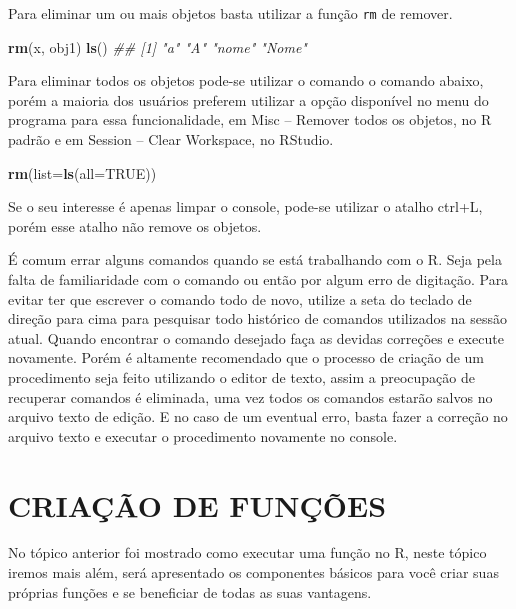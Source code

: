 \documentclass[
  11pt,
  a5paper,
  openany]{book}
\newenvironment{Shaded}{\begin{snugshade}}{\end{snugshade}}
\newcommand{\CommentTok}[1]{\textcolor[rgb]{0.56,0.35,0.01}{\textit{#1}}}
\newcommand{\DataTypeTok}[1]{\textcolor[rgb]{0.13,0.29,0.53}{#1}}
\newcommand{\KeywordTok}[1]{\textcolor[rgb]{0.13,0.29,0.53}{\textbf{#1}}}
\newcommand{\NormalTok}[1]{#1}
\newcommand{\OtherTok}[1]{\textcolor[rgb]{0.56,0.35,0.01}{#1}}
\begin{document}
Para eliminar um ou mais objetos basta utilizar a função \texttt{rm} de remover.

\begin{Shaded}
\begin{Highlighting}[]
\KeywordTok{rm}\NormalTok{(x, obj1)}
\KeywordTok{ls}\NormalTok{()}
\CommentTok{## [1] "a" "A" "nome" "Nome"}
\end{Highlighting}
\end{Shaded}

Para eliminar todos os objetos pode-se utilizar o comando o comando abaixo, porém a maioria dos usuários preferem utilizar a opção disponível no menu do programa para essa funcionalidade, em Misc -- Remover todos os objetos, no R padrão e em Session -- Clear Workspace, no RStudio.

\begin{Shaded}
\begin{Highlighting}[]
\KeywordTok{rm}\NormalTok{(}\DataTypeTok{list=}\KeywordTok{ls}\NormalTok{(}\DataTypeTok{all=}\OtherTok{TRUE}\NormalTok{))}
\end{Highlighting}
\end{Shaded}

Se o seu interesse é apenas limpar o console, pode-se utilizar o atalho ctrl+L, porém esse atalho não remove os objetos.

É comum errar alguns comandos quando se está trabalhando com o R. Seja pela falta de familiaridade com o comando ou então por algum erro de digitação. Para evitar ter que escrever o comando todo de novo, utilize a seta do teclado de direção para cima para pesquisar todo histórico de comandos utilizados na sessão atual. Quando encontrar o comando desejado faça as devidas correções e execute novamente. Porém é altamente recomendado que o processo de criação de um procedimento seja feito utilizando o editor de texto, assim a preocupação de recuperar comandos é eliminada, uma vez todos os comandos estarão salvos no arquivo texto de edição. E no caso de um eventual erro, basta fazer a correção no arquivo texto e executar o procedimento novamente no console.

\hypertarget{criauxe7uxe3o-de-funuxe7uxf5es}{%
\chapter{CRIAÇÃO DE FUNÇÕES}\label{criauxe7uxe3o-de-funuxe7uxf5es}}

No tópico anterior foi mostrado como executar uma função no R, neste tópico iremos mais além, será apresentado os componentes básicos para você criar suas próprias funções e se beneficiar de todas as suas vantagens.
\end{document}
